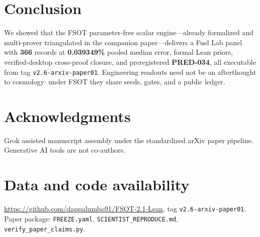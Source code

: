 \documentclass[11pt,a4paper]{article}
\begin{document}
\section{Conclusion}
\label{sec:conc}

We showed that the FSOT parameter-free scalar engine---already formalized and
multi-prover triangulated in the companion paper---delivers a Fuel Lab panel
with \textbf{366} records at \textbf{0.039349\%} pooled median error, formal
Lean priors, verified-desktop cross-proof closure, and preregistered
\textbf{PRED-034}, all executable from tag \texttt{v2.6-arxiv-paper01}.
Engineering readouts need not be an afterthought to cosmology: under FSOT they
share seeds, gates, and a public ledger.

\section*{Acknowledgments}
Grok assisted manuscript assembly under the standardized arXiv paper pipeline.
Generative AI tools are not co-authors.

\section*{Data and code availability}
\url{https://github.com/dappalumbo91/FSOT-2.1-Lean},
tag \texttt{v2.6-arxiv-paper01}.
Paper package: \texttt{FREEZE.yaml}, \texttt{SCIENTIST\_REPRODUCE.md},
\texttt{verify\_paper\_claims.py}.



\end{document}
